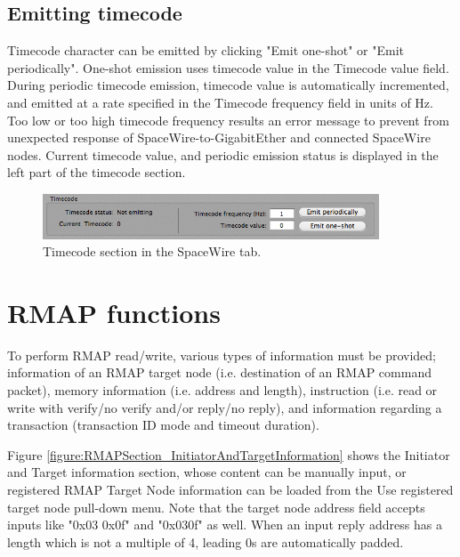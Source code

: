 \documentclass[a4paper,10pt]{article}
\begin{document}
\subsection{Emitting timecode}
Timecode character can be emitted by clicking "Emit one-shot" or "Emit periodically".
One-shot emission uses timecode value in the Timecode value field.
During periodic timecode emission, timecode value is automatically incremented, and emitted at a rate specified in the Timecode frequency field in units of Hz. Too low or too high timecode frequency results an error message to prevent from unexpected response of SpaceWire-to-GigabitEther and connected SpaceWire nodes. Current timecode value, and periodic emission status is displayed in the left part of the timecode section.

\begin{figure}[htb]
\begin{center}
\includegraphics[width=10cm]{figures/SpaceWireRMAPGUI/SpaceWireSection_TimecodeSection.png}
\vspace{-2mm}
\caption{Timecode section in the SpaceWire tab.}
\label{figure:SpaceWireSection_TimecodeSection}
\end{center}
\end{figure}


\section{RMAP functions}
To perform RMAP read/write, various types of information must be provided; information of an RMAP target node (i.e. destination of an RMAP command packet), memory information (i.e. address and length), instruction (i.e. read or write with verify/no verify and/or reply/no reply), and information regarding a transaction (transaction ID mode and timeout duration).

Figure \ref{figure:RMAPSection_InitiatorAndTargetInformation} shows  the Initiator and Target information section, whose content can be manually input, or registered RMAP Target Node information can be loaded from the Use registered target node pull-down menu. Note that the target node address field accepts inputs like "0x03 0x0f" and "0x030f" as well. When an input reply address has a length which is not a multiple of 4, leading 0s are automatically padded.
\end{document}
